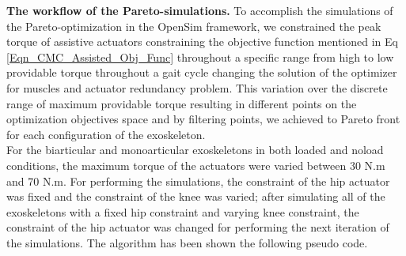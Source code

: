 \documentclass[10pt,letterpaper]{article}
\begin{document}
\textbf{The workflow of the Pareto-simulations.} To accomplish the simulations of the Pareto-optimization in the OpenSim framework, we constrained the peak torque of assistive actuators constraining the objective function mentioned in Eq \ref{Eqn_CMC_Assisted_Obj_Func} throughout a specific range from high to low providable torque throughout a gait cycle changing the solution of the optimizer for muscles and actuator redundancy problem. This variation over the discrete range of maximum providable torque resulting in different points on the optimization objectives space and by filtering points, we achieved to Pareto front for each configuration of the exoskeleton.\\
For the biarticular and monoarticular exoskeletons in both loaded and noload conditions, the maximum torque of the actuators were varied between 30 N.m and 70 N.m. For performing the simulations, the constraint of the hip actuator was fixed and the constraint of the knee was varied; after simulating all of the exoskeletons with a fixed hip constraint and varying knee constraint, the constraint of the hip actuator was changed for performing the next iteration of the simulations. The algorithm has been shown the following pseudo code.\\
\end{document}
